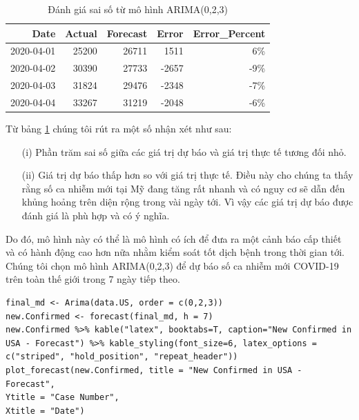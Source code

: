 \documentclass[12pt, a4paper,oneside]{book}
\theoremstyle{definition}
\begin{document}
\begin{table}[!h]	
	\caption{Đánh giá sai số từ mô hình ARIMA(0,2,3)}
	\label{u1}
	\centering
	\fontsize{6}{8}\selectfont
	\begin{tabular}[t]{rrrrr}
		\toprule
		Date &Actual & Forecast & Error & Error\_Percent\\
		\midrule
		\rowcolor{gray!6} 2020-04-01 &25200 & 26711 & 1511 & 6\%\\
		2020-04-02 &30390 & 27733 & -2657 & -9\%\\
		\rowcolor{gray!6} 2020-04-03 &31824 & 29476 & -2348 & -7\%\\
	    2020-04-04 &33267 & 31219 & -2048 & -6\%\\
		\bottomrule
	\end{tabular}
\end{table}
Từ bảng \ref{u1} chúng tôi rút ra một số nhận xét như sau:
\begin{itemize}
	\item[(i)] Phần trăm sai số giữa các giá trị dự báo và giá trị thực tế tương đối nhỏ.
	\item[(ii)] Giá trị dự báo thấp hơn so với giá trị thực tế. Điều này cho chúng ta thấy rằng số ca nhiễm mới tại Mỹ đang tăng rất nhanh và có nguy cơ sẽ dẫn đến khủng hoảng trên diện rộng trong vài ngày tới. Vì vậy các giá trị dự báo được đánh giá là phù hợp và có ý nghĩa.
\end{itemize}
Do đó, mô hình này có thể là mô hình có ích để đưa ra một cảnh báo cấp thiết và có hành động cao hơn nữa nhằm kiểm soát tốt dịch bệnh trong thời gian tới. Chúng tôi chọn mô hình ARIMA(0,2,3) để dự báo số ca nhiễm mới COVID-19 trên toàn thế giới trong 7 ngày tiếp theo.
\begin{lstlisting}
final_md <- Arima(data.US, order = c(0,2,3))
new.Confirmed <- forecast(final_md, h = 7)
new.Confirmed %>% kable("latex", booktabs=T, caption="New Confirmed in USA - Forecast") %>% kable_styling(font_size=6, latex_options = c("striped", "hold_position", "repeat_header"))
plot_forecast(new.Confirmed, title = "New Confirmed in USA - Forecast",
Ytitle = "Case Number",
Xtitle = "Date")
\end{lstlisting}
\end{document}
